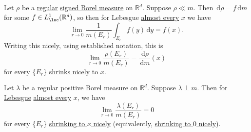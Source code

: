 \begin{corollary}
	Let \(\rho\) be a \hyperref[def:regular]{regular} \hyperref[def:signed-measure]{signed Borel measure} on \(\mathbb{R}^d\). Suppose \(\rho \ll m\). Then
	\(\,\mathrm{d}\rho = f\,\mathrm{d}m\) for some \(f \in L^1_{\loc}(\mathbb{R}^d)\), so then for Lebesgue \hyperref[def:mu-almost-everywhere]{almost every} \(x\)
	we have
	\[
		\lim_{r \to 0} \frac{1}{m(E_r)} \int_{E_r} f(y) \,\mathrm{d}y = f(x).
	\]
	Writing this nicely, using established notation, this is
	\[
		\lim_{r \to 0} \frac{\rho(E_r)}{m(E_r)} = \frac{\,\mathrm{d}\rho}{\,\mathrm{d}m}(x)
	\]
	for every \(\{E_r\}\) \hyperref[def:shrink-nicely]{shrinks nicely} to \(x\).
\end{corollary}

\begin{proposition}\label{prop:lec-32}
	Let \(\lambda\) be a \hyperref[def:regular]{regular} \hyperref[def:signed-measure]{positive Borel measure} on \(\mathbb{R}^d\). Suppose \(\lambda \perp m\).
	Then for \hyperref[def:Lebesgue-measure]{Lebesgue} \hyperref[def:mu-almost-everywhere]{almost every} \(x\), we have
	\[
		\lim_{r \to 0} \frac{\lambda(E_r)}{m(E_r)} = 0
	\]
	for every \(\{E_r\}\) \hyperref[def:shrink-nicely]{shrinking to \(x\) nicely} (equivalently, \hyperref[def:shrink-nicely]{shrinking to \(0\) nicely}).
\end{proposition}

